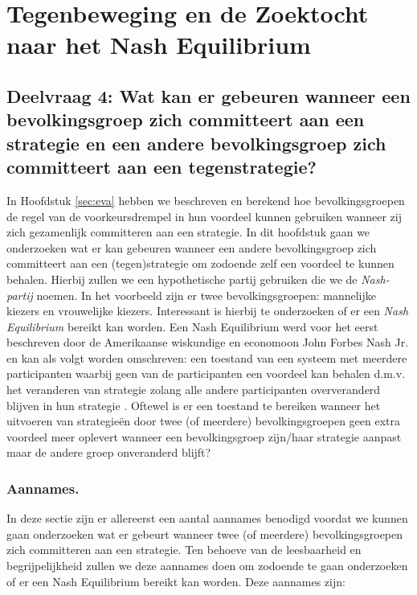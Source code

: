 \newpage
\section{Tegenbeweging en de Zoektocht naar het Nash Equilibrium}
\label{h7}

\subsection*{Deelvraag 4: Wat kan er gebeuren wanneer een bevolkingsgroep zich committeert aan een strategie en een andere bevolkingsgroep zich committeert aan een tegenstrategie?}


In Hoofdstuk \ref{sec:eva} hebben we beschreven en berekend hoe bevolkingsgroepen de regel van de voorkeursdrempel in hun voordeel kunnen gebruiken wanneer zij zich gezamenlijk committeren aan een strategie. In dit hoofdstuk gaan we onderzoeken wat er kan gebeuren wanneer een andere bevolkingsgroep zich committeert aan een (tegen)strategie om zodoende zelf een voordeel te kunnen behalen. Hierbij zullen we een hypothetische partij gebruiken die we de \textit{Nash-partij} noemen. In het voorbeeld zijn er twee bevolkingsgroepen: mannelijke kiezers en vrouwelijke kiezers. Interessant is hierbij te onderzoeken of er een \textit{Nash Equilibrium} bereikt kan worden. Een Nash Equilibrium werd voor het eerst beschreven door de Amerikaanse wiskundige en economoon John Forbes Nash Jr. \citeyearpar{nash1950equilibrium} en kan als volgt worden omschreven: een toestand van een systeem met meerdere participanten waarbij geen van de participanten een voordeel kan behalen d.m.v. het veranderen van strategie zolang alle andere participanten oververanderd blijven in hun strategie \citep{christiansen2016neuroeconomics, nashprinceton}. Oftewel is er een toestand te bereiken wanneer het uitvoeren van strategie\"{e}n door twee (of meerdere) bevolkingsgroepen geen extra voordeel meer oplevert wanneer een bevolkingsgroep zijn/haar strategie aanpast maar de andere groep onveranderd blijft? 

\subsubsection*{Aannames.} \label{aannamesNash}
In deze sectie zijn er allereerst een aantal aannames benodigd voordat we kunnen gaan onderzoeken wat er gebeurt wanneer twee (of meerdere) bevolkingsgroepen zich committeren aan een strategie. Ten behoeve van de leesbaarheid en begrijpelijkheid zullen we deze aannames doen om zodoende te gaan onderzoeken of er een Nash Equilibrium bereikt kan worden. Deze aannames zijn:

